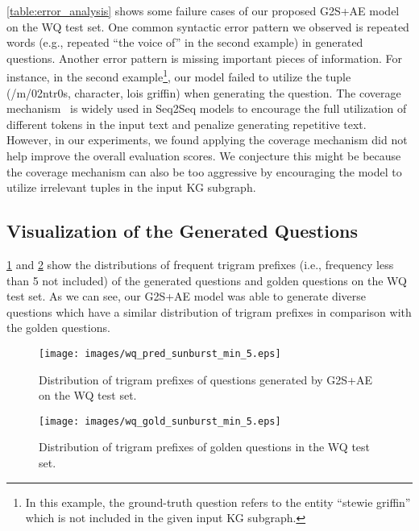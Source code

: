 \documentclass[journal]{IEEEtran}
\begin{document}
\cref{table:error_analysis} shows some failure cases of our proposed G2S+AE model on the WQ test set. One common syntactic error pattern we observed is repeated words (e.g., repeated ``the voice of'' in the second example) in generated questions. 
Another error pattern is missing important pieces of information. For instance, in the second example\footnote{In this example, the ground-truth question refers to the entity ``stewie griffin'' which is not included in the given input KG subgraph.}, our model failed to utilize the tuple (/m/02ntr0s, character, lois griffin) when generating the question.
The coverage mechanism~\cite{tu2016modeling} is widely used in Seq2Seq models to encourage the full utilization of different tokens in the input text and penalize generating repetitive text. However, in our experiments, we found applying the coverage mechanism did not help improve the overall evaluation scores.
We conjecture this might be because the coverage mechanism can also be too aggressive by encouraging the model to utilize irrelevant tuples in the input KG subgraph.


\subsection{Visualization of the Generated Questions}


\cref{fig:pred_vis_q} and \cref{fig:gold_vis_q} show the distributions of frequent trigram prefixes (i.e., frequency less than 5 not included) of the generated questions and golden questions on the WQ test set. As we can see, our G2S+AE model was able to generate diverse questions which have a similar distribution of trigram prefixes in comparison with the golden questions.




\begin{figure}[!htb]
  \vspace{-4mm}
  \centering
    \texttt{[image: images/wq\_pred\_sunburst\_min\_5.eps]}
  \caption{Distribution of trigram prefixes of questions generated by G2S+AE on the WQ test set.}
  \label{fig:pred_vis_q}
  \vspace{-4mm}
\end{figure}



\begin{figure}[!htb]
\vspace{-4mm}
  \centering
    \texttt{[image: images/wq\_gold\_sunburst\_min\_5.eps]}
  \caption{Distribution of trigram prefixes of golden questions in the WQ test set.}
  \label{fig:gold_vis_q}
  \vspace{-5mm}
\end{figure}
\end{document}
